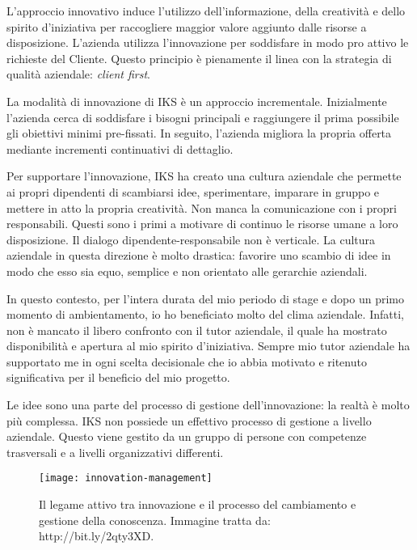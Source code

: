 L'approccio innovativo induce l'utilizzo dell'informazione, della creatività e 
dello spirito d'iniziativa per raccogliere maggior valore aggiunto dalle risorse a 
disposizione. L'azienda utilizza l'innovazione per soddisfare in modo pro attivo 
le richieste del Cliente. Questo principio è pienamente il linea con la strategia 
di qualità aziendale: \textit{client first}.

La modalità di innovazione di IKS è un approccio incrementale. Inizialmente 
l'azienda cerca di soddisfare i bisogni principali e raggiungere il prima 
possibile gli obiettivi minimi pre-fissati. In seguito, l'azienda migliora 
la propria offerta mediante incrementi continuativi di dettaglio. 

Per supportare l'innovazione, IKS ha creato una cultura aziendale che permette 
ai propri dipendenti di scambiarsi idee, sperimentare, imparare in gruppo e mettere in 
atto la propria creatività. Non manca la comunicazione con i propri responsabili. 
Questi sono i primi a motivare di continuo le risorse umane a loro disposizione. 
Il dialogo dipendente-responsabile non è verticale. La cultura aziendale in questa 
direzione è molto drastica: favorire uno scambio di idee in modo che esso sia  
equo, semplice e non orientato alle gerarchie aziendali. 

In questo contesto, per l'intera durata del mio periodo di stage e dopo un 
primo momento di ambientamento, io ho beneficiato molto del clima aziendale. 
Infatti, non è mancato il libero confronto con il tutor aziendale, il quale ha  
mostrato disponibilità e apertura al mio spirito d'iniziativa. Sempre mio tutor 
aziendale ha supportato me in ogni scelta decisionale che io abbia motivato e 
ritenuto significativa per il beneficio del mio progetto. 

Le idee sono una parte del processo di gestione dell'innovazione: la realtà è 
molto più complessa. IKS non possiede un effettivo processo di gestione a 
livello aziendale. Questo viene gestito da un gruppo di persone con competenze 
trasversali e a livelli organizzativi differenti. 

\begin{figure}[htbp]
   \begin{center}
	\texttt{[image: innovation-management]}
	\caption{Il legame attivo tra innovazione e il processo del cambiamento 
	e gestione della conoscenza. Immagine tratta da: http://bit.ly/2qty3XD.}
   \end{center}
\end{figure}

\newpage 